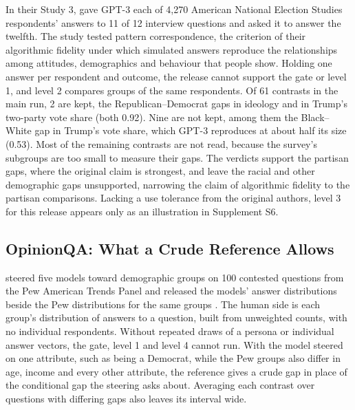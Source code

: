 In their Study 3, \citet{argyle2023outofone} gave GPT-3 each of 4,270 American National Election Studies respondents' answers to 11 of 12 interview questions and asked it to answer the twelfth. %
The study tested pattern correspondence, the criterion of their algorithmic fidelity under which simulated answers reproduce the relationships among attitudes, demographics and behaviour that people show.
Holding one answer per respondent and outcome, the release cannot support the gate or level 1, and level 2 compares groups of the same respondents.
Of 61 contrasts in the main run, 2 are kept, the Republican--Democrat gaps in ideology and in Trump's two-party vote share (both 0.92). %
Nine are not kept, among them the Black--White gap in Trump's vote share, which GPT-3 reproduces at about half its size (0.53). %
Most of the remaining contrasts are not read, because the survey's subgroups are too small to measure their gaps. %
The verdicts support the partisan gaps, where the original claim is strongest, and leave the racial and other demographic gaps unsupported, narrowing the claim of algorithmic fidelity to the partisan comparisons.
Lacking a use tolerance from the original authors, level 3 for this release appears only as an illustration in Supplement S6.

\subsection{OpinionQA: What a Crude Reference Allows}

\citet{meister2025distributional} steered five models toward demographic groups on 100 contested questions from the Pew American Trends Panel and released the models' answer distributions beside the Pew distributions for the same groups \citep{santurkar2023whose}.
The human side is each group's distribution of answers to a question, built from unweighted counts, with no individual respondents.
Without repeated draws of a persona or individual answer vectors, the gate, level 1 and level 4 cannot run.
With the model steered on one attribute, such as being a Democrat, while the Pew groups also differ in age, income and every other attribute, the reference gives a crude gap in place of the conditional gap the steering asks about.
Averaging each contrast over questions with differing gaps also leaves its interval wide.

